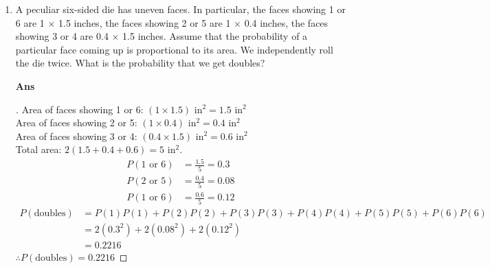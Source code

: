 \documentclass[paper=usletter, fontsize=12pt]{article}
\begin{document}
\begin{enumerate}
        \item A peculiar six-sided die has uneven faces. In particular, the
        faces showing 1 or 6 are 1 $\times$ 1.5 inches, the faces showing 2 or
        5 are 1 $\times$ 0.4 inches, the faces showing 3 or 4 are 0.4 $\times$
        1.5 inches. Assume that the probability of a particular face coming up
        is proportional to its area. We independently roll the die twice. What
        is the probability that we get doubles?
        \item[\textbf{Ans}]
        \begin{proof}[\unskip\nopunct]
            Area of faces showing 1 or 6: $(1 \times 1.5) \text{\ in}^2 = 1.5
            \text{\ in}^2$ \\
            Area of faces showing 2 or 5: $(1 \times 0.4) \text{\ in}^2 = 0.4
            \text{\ in}^2$ \\
            Area of faces showing 3 or 4: $(0.4 \times 1.5) \text{\ in}^2 = 0.6
            \text{\ in}^2$ \\
            Total area: $2(1.5 + 0.4 + 0.6) = 5 \text{\ in}^2$. \\
            \begin{align*}
                P(\text{1 or 6}) & = \frac{1.5}{5} = 0.3 \\
                P(\text{2 or 5}) & = \frac{0.4}{5} = 0.08 \\
                P(\text{1 or 6}) & = \frac{0.6}{5} = 0.12
            \end{align*}
            \begin{align*}
                P(\text{doubles}) & = P(\text{1})P(\text{1}) + P(\text{2})P(\text{2}) + P(\text{3})P(\text{3}) + P(\text{4})P(\text{4}) + P(\text{5})P(\text{5}) + P(\text{6})P(\text{6}) \\
                & = 2(0.3^2) + 2(0.08^2) + 2(0.12^2) \\
                & = 0.2216
            \end{align*}
            $\therefore P(\text{doubles}) = 0.2216$ \qedhere
        \end{proof}
        \vspace{0.2in}

    \end{enumerate}
\end{document}
